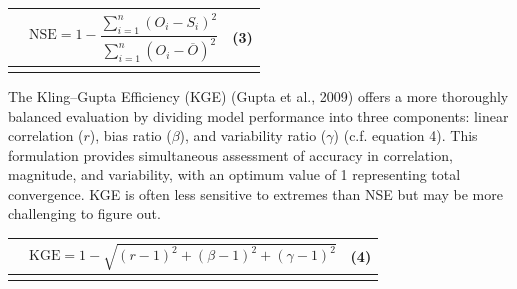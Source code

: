 \documentclass[
]{article}
\newcounter{none} %
\begin{document}
{\def\LTcaptype{none} %
\begin{longtable}[]{@{}
  >{\raggedright\arraybackslash}p{}
  >{\raggedright\arraybackslash}p{}
  >{\raggedright\arraybackslash}p{}@{}}
\toprule\noalign{}
\begin{minipage}[b]{\linewidth}\raggedright
\end{minipage} & \begin{minipage}[b]{\linewidth}\centering
\[\text{NSE} = 1 - \frac{\sum_{i = 1}^{n}\left( O_{i} - S_{i} \right)^{2}}{\sum_{i = 1}^{n}\left( O_{i} - \overline{O} \right)^{2}}\]
\end{minipage} & \begin{minipage}[b]{\linewidth}\raggedright
(3)
\end{minipage} \\
\midrule\noalign{}
\endhead
\bottomrule\noalign{}
\endlastfoot
\end{longtable}
}

The Kling--Gupta Efficiency (KGE) (Gupta et al., 2009) offers a more
thoroughly balanced evaluation by dividing model performance into three
components: linear correlation (\(r\)), bias ratio (\(\beta\)), and
variability ratio (\(\gamma\)) (c.f. equation 4). This formulation
provides simultaneous assessment of accuracy in correlation, magnitude,
and variability, with an optimum value of 1 representing total
convergence. KGE is often less sensitive to extremes than NSE but may be
more challenging to figure out.

{\def\LTcaptype{none} %
\begin{longtable}[]{@{}
  >{\raggedright\arraybackslash}p{}
  >{\raggedright\arraybackslash}p{}
  >{\raggedright\arraybackslash}p{}@{}}
\toprule\noalign{}
\begin{minipage}[b]{\linewidth}\raggedright
\end{minipage} & \begin{minipage}[b]{\linewidth}\centering
\[\text{KGE} = 1 - \sqrt{(r - 1)^{2} + (\beta - 1)^{2} + (\gamma - 1)^{2}}\]
\end{minipage} & \begin{minipage}[b]{\linewidth}\raggedright
(4)
\end{minipage} \\
\midrule\noalign{}
\endhead
\bottomrule\noalign{}
\endlastfoot
\end{longtable}
}
\end{document}
